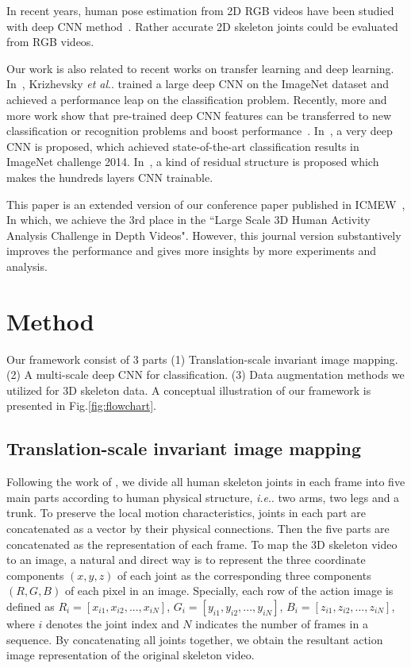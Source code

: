 \documentclass[10pt,journal]{IEEEtran}
\makeatletter
\DeclareRobustCommand\onedot{\futurelet\@let@token\@onedot}
\def\@onedot{\ifx\@let@token.\else.\null\fi\xspace}
\def\ie{\emph{i.e}\onedot} \def\Ie{\emph{I.e}\onedot}
\def\etal{\emph{et al}\onedot}
\makeatother
\begin{document}
In recent years, human pose estimation from 2D RGB videos have been studied with deep CNN method~\cite{Zhou2015Sparseness,Yang2016End,Toshev2013DeepPose}. Rather accurate 2D skeleton joints could be evaluated from RGB videos.

Our work is also related to recent works on transfer learning and deep learning. In~\cite{krizhevsky2012imagenet}, Krizhevsky \etal trained a large deep CNN on the ImageNet dataset and achieved a performance leap on the classification problem. Recently, more and more work show that pre-trained deep CNN features can be transferred to new classification or recognition problems and boost performance~\cite{Girshick2013Rich, oquab2013learning}. In~\cite{Simonyan2014Very}, a very deep CNN is proposed, which achieved state-of-the-art classification results in ImageNet challenge 2014. In~\cite{ResNet}, a kind of residual structure is proposed which makes the hundreds layers CNN trainable. 

This paper is an extended version of our conference paper published in ICMEW~\cite{}, In which, we achieve the 3rd place in the ``Large Scale 3D Human Activity Analysis Challenge in Depth Videos".  However, this journal version substantively improves the performance and gives more insights by more experiments and analysis.


\section{Method}\label{method}
Our framework consist of 3 parts (1) Translation-scale invariant image mapping. (2) A multi-scale deep CNN for classification. (3) Data augmentation methods we utilized for 3D skeleton data. A conceptual illustration of our framework is presented in Fig.\ref{fig:flowchart}.

\subsection{Translation-scale invariant image mapping}
Following the work of \cite{Yong2015Skeleton}, we divide all human skeleton joints in each frame into five main parts according to human physical structure, \ie two arms, two legs and a trunk. To preserve the local motion characteristics, joints in each part are concatenated as a vector by their physical connections. Then the five parts are concatenated as the representation of each frame. To map the 3D skeleton video to an image, a natural and direct way is to represent the three coordinate components $(x,y,z)$ of each joint as the corresponding three components $(R,G,B)$ of each pixel in an image. Specially, each row of the action image is defined as $R_i = [x_{i1},x_{i2},...,x_{iN}]$, $G_i = [y_{i1},y_{i2},...,y_{iN}]$, $B_i = [z_{i1},z_{i2},...,z_{iN}]$, where $i$ denotes the joint index and $N$ indicates the number of frames in a sequence. By concatenating all joints together, we obtain the resultant action image representation of the original skeleton video.
\end{document}
